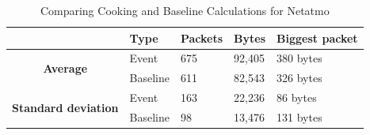\begin{table}[H]
    \centering
    \caption{Comparing Cooking and Baseline Calculations for Netatmo}
    \begin{tabular}{c|l|l|l|l|}
        \cline{2-5}
        \multicolumn{1}{l|}{}                                              & \textbf{Type} & \textbf{Packets} & \textbf{Bytes} & \textbf{Biggest packet} \\ \hline
        \multicolumn{1}{|c|}{\multirow{2}{*}{\textbf{Average}}}            & Event         & 675              & 92,405         & 380 bytes               \\ \cline{2-5} 
        \multicolumn{1}{|c|}{}                                             & Baseline      & 611              & 82,543         & 326 bytes                \\ \hline
        \multicolumn{1}{|c|}{\multirow{2}{*}{\textbf{Standard deviation}}} & Event         & 163              & 22,236         & 86 bytes                 \\ \cline{2-5} 
        \multicolumn{1}{|c|}{}                                             & Baseline      & 98               & 13,476         & 131 bytes               \\ \hline          
    \end{tabular}
    \label{tab:NetatmoComparingBaselineAndCookingCalculations}
\end{table}

